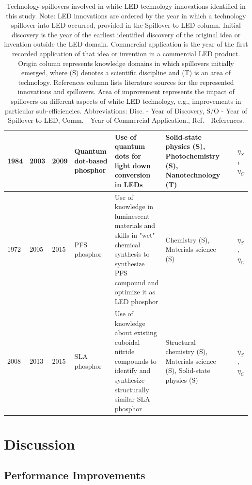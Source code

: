 \documentclass[journal=jacsat,manuscript=article]{achemso}
\begin{document}
\begin{table}[h!]
\begin{tabularx}{\textwidth}{|l|l|l|X|X|X|l|X|}
        1984 & 2003 & 2009 & Quantum dot-based phosphor & Use of quantum dots for light down conversion in LEDs & Solid-state physics (S), Photochemistry (S), Nanotechnology (T) &\cite{fojtik1984photo}\cite{simmonsfinal}\cite{ledprof_nexxusqd}\cite{bourzac2013quantum} & $\eta_S$, $\eta_C$ \\ \hline
        1972 & 2005 & 2015 & PFS phosphor & Use of knowledge in luminescent materials and skills in "wet" chemical synthesis to synthesize PFS compound and optimize it as LED phosphor & Chemistry (S), Materials science (S) &\cite{paulusz1973efficient}\cite{radkov2009red}\cite{Murphy2015} & $\eta_S$, $\eta_C$ \\ \hline
        2008 & 2013 & 2015 & SLA phosphor & Use of knowledge about existing cuboidal nitride compounds to identify and synthesize structurally similar SLA phosphor & Structural chemistry (S), Materials science (S), Solid-state physics (S) &\cite{Park2008New}\cite{schmidt2013new}\cite{Pust2014} & $\eta_S$, $\eta_C$ \\ \hline
    \end{tabularx}
    \caption{Technology spillovers involved in white LED technology innovations identified in this study. Note: LED innovations are ordered by the year in which a technology spillover into LED occurred, provided in the Spillover to LED column. Initial discovery is the year of the earliest identified discovery of the original idea or invention outside the LED domain. Commercial application is the year of the first recorded application of that idea or invention in a commercial LED product. Origin column represents knowledge domains in which spillovers initially emerged, where (S) denotes a scientific discipline and (T) is an area of technology. References column lists literature sources for the represented innovations and spillovers. Area of improvement represents the impact of spillovers on different aspects of white LED technology, e.g., improvements in particular sub-efficiencies. Abbreviations: Disc. - Year of Discovery, S/O - Year of Spillover to LED, Comm. - Year of Commercial Application., Ref. - References.}
    \label{tab:spillovers}
\end{table}

\section{Discussion}

\subsection{Performance Improvements}
\end{document}
